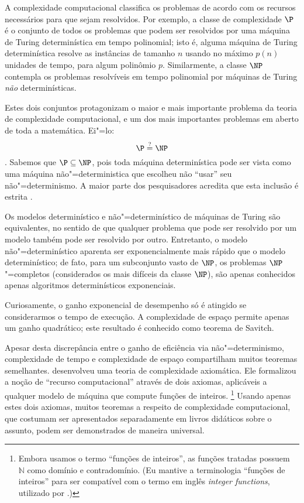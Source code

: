 A complexidade computacional classifica os problemas
de acordo com os recursos necessários para que sejam resolvidos.
Por exemplo,
a classe de complexidade $\P$
é o conjunto de todos os problemas que podem ser resolvidos
por uma máquina de Turing determinística
em tempo polinomial;
isto é,
alguma máquina de Turing determinística
resolve as instâncias de tamanho $n$
usando no máximo $p(n)$ unidades de tempo,
para algum polinômio $p$.
Similarmente,
a classe $\NP$
contempla os problemas resolvíveis em tempo polinomial
por máquinas de Turing \emph{não} determinísticas.

Estes dois conjuntos protagonizam
o maior e mais importante problema da teoria de complexidade computacional,
e um dos mais importantes problemas em aberto de toda a matemática.
Ei"=lo:
\begin{displaymath}
    \P \stackrel?= \NP
\end{displaymath}
\cite[p.~270]{Sipser2006}.
Sabemos que $\P \subseteq \NP$,
pois toda máquina determinística pode ser vista como
uma máquina não"=deterministica que escolheu não ``usar''
seu não"=determinismo.
A maior parte dos pesquisadores acredita que
esta inclusão é estrita \cite[p.~2]{Gasarch2012}.

Os modelos determinístico e não"=determinístico de máquinas de Turing são equivalentes,
no sentido de que qualquer problema que pode ser resolvido por um modelo
também pode ser resolvido por outro.
Entretanto, o modelo não"=determinístico
aparenta ser exponencialmente mais rápido que
o modelo determinístico;
de fato, para um subconjunto vasto de $\NP$,
os problemas $\NP$"=completos
(considerados os mais difíceis da classe $\NP$),
são apenas conhecidos apenas algoritmos determinísticos exponenciais.

Curiosamente,
o ganho exponencial de desempenho
só é atingido se considerarmos o tempo de execução.
A complexidade de espaço permite apenas um ganho quadrático;
este resultado é conhecido como teorema de Savitch.

Apesar desta discrepância entre o ganho de eficiência via não"=determinismo,
complexidade de tempo e complexidade de espaço
compartilham muitos teoremas semelhantes.
 desenvolveu uma teoria de complexidade axiomática.
Ele formalizou a noção de ``recurso computacional''
através de dois axiomas,
aplicáveis a qualquer modelo de máquina que compute funções de inteiros.
\footnote{
    Embora usamos o termo ``funções de inteiros'',
    as funções tratadas possuem~$\mathbb N$ como domínio e contradomínio.
    (Eu mantive a terminologia ``funções de inteiros''
    para ser compatível com o termo em inglês \emph{integer functions},
    utilizado por .)
}
Usando apenas estes dois axiomas,
muitos teoremas a respeito de complexidade computacional,
que costumam ser apresentados separadamente em livros didáticos sobre o assunto,
podem ser demonstrados de maneira universal.

